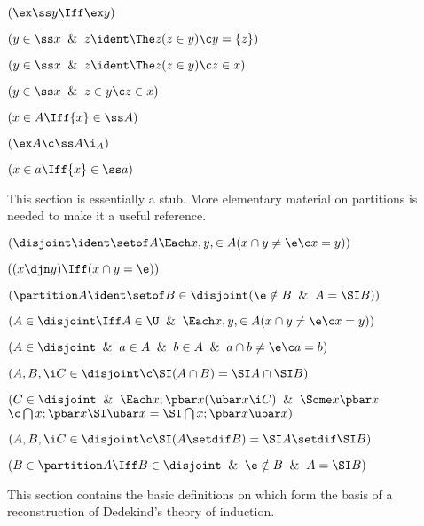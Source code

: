  $(\ex \ss y \Iff \ex y)$

 $(y \in \ss x \And  z \ident \The z (z\in y) \c y = \{z\})$

 $(y \in \ss x \And  z \ident \The z (z\in y) \c z\in x)$

 $(y \in \ss x \And z \in y \c z \in x)$

 $(x \in A \Iff \{x\} \in \ss A)$

 $(\ex A \c \ss A \i \sb A)$


 $(x \in a \Iff \{x\} \in \ss a)$



\lineb


This section is essentially a stub.  More elementary material on partitions
is needed to make it a useful reference.
\lineb


 $(\disjoint \ident \setof A \Each x,y, \in A
(x \cap y \ne \e \c x = y))$

 $((x \djn y) \Iff (x \cap y = \e))$

 $(\partition A \ident \setof B \in \disjoint (\e \notin B \And  A = \SI B))$



 $(A \in \disjoint \Iff A \in \U \And  \Each x,y, \in A
(x \cap y \ne \e \c x = y))$

 $(A \in \disjoint \And a\in A \And b \in A
\And a \cap b \ne \e \c a = b)$

 $(A,B, \i C \in \disjoint
	\c \SI (A \cap B) = \SI A \cap \SI B)$

 $(C \in \disjoint \And \Each x;\pbar x(\ubar x \i C) \And  
	\Some x \pbar x $
 $ \c \bigcap x;\pbar x \SI \ubar x
		=\SI \bigcap x;\pbar x \ubar x)$

 $(A,B, \i C \in \disjoint
	\c \SI (A \setdif B) = \SI A \setdif \SI B)$

 $(B \in \partition A \Iff B \in \disjoint \And \e \notin B \And A=\SI B)$
\lineb




This section contains the basic definitions on which form the basis of a reconstruction
of Dedekind's theory of induction. 
\lineb

 
